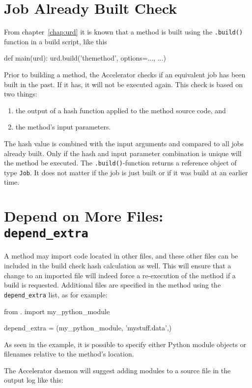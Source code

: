 \section{Job Already Built Check}

From chapter~\ref{chap:urd} it is known that a method is built using
the \texttt{.build()} function in a build script, like this
\begin{python}
def main(urd):
    urd.build('themethod', options=..., ...)
\end{python}

Prior to building a method, the Accelerator checks if an equivalent
job has been built in the past.  If it has, it will not be executed
again.  This check is based on two things:
\begin{enumerate}
\item  the output of a hash function applied to the method source code, and
\item  the method's input parameters.
\end{enumerate}
The hash value is combined with the input arguments and compared to
all jobs already built.  Only if the hash and input parameter
combination is unique will the method be executed.  The
\texttt{.build()}-function returns a reference object of type
\texttt{Job}.  It does not matter if the job is just built or if it
was build at an earlier time.



\section{Depend on More Files:  \texttt{depend\_extra}}

A method may import code located in other files, and these other files
can be included in the build check hash calculation as well.  This
will ensure that a change to an imported file will indeed force a
re-execution of the method if a build is requested.  Additional files
are specified in the method using the \texttt{depend\_extra} list, as
for example:
\begin{python}
from . import my_python_module

depend_extra = (my_python_module, 'mystuff.data',)
\end{python}
As seen in the example, it is possible to specify either Python module
objects or filenames relative to the method's location.

The Accelerator daemon will suggest adding modules to a source file in
the output log like this:

